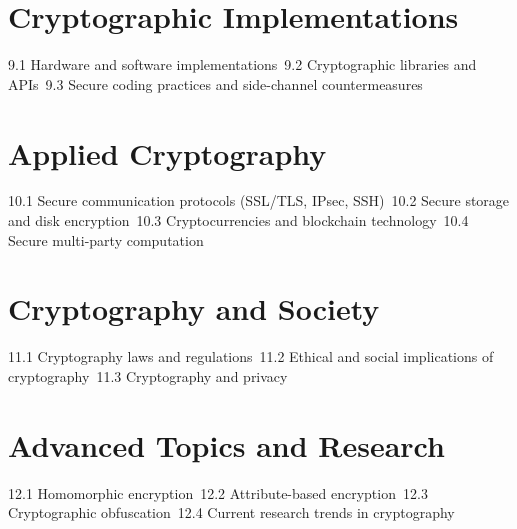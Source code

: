 \section{Cryptographic Implementations}
9.1 Hardware and software implementations\
9.2 Cryptographic libraries and APIs\
9.3 Secure coding practices and side-channel countermeasures\
\section{Applied Cryptography}
10.1 Secure communication protocols (SSL/TLS, IPsec, SSH)\
10.2 Secure storage and disk encryption\
10.3 Cryptocurrencies and blockchain technology\
10.4 Secure multi-party computation\
\section{Cryptography and Society}
11.1 Cryptography laws and regulations\
11.2 Ethical and social implications of cryptography\
11.3 Cryptography and privacy\
\section{Advanced Topics and Research}
12.1 Homomorphic encryption\
12.2 Attribute-based encryption\
12.3 Cryptographic obfuscation\
12.4 Current research trends in cryptography\
